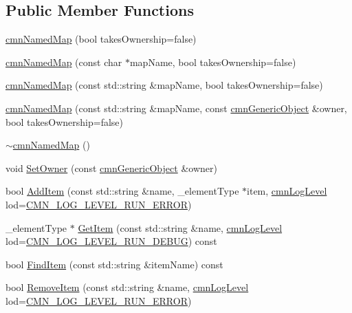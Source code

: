\subsection*{Public Member Functions}
\begin{DoxyCompactItemize}
\item 
\hyperlink{classcmn_named_map_a4c250a20fc4693af98372a5bddf23fc3}{cmn\+Named\+Map} (bool takes\+Ownership=false)
\item 
\hyperlink{classcmn_named_map_a9204d10744786fb89a8a4c257657f7af}{cmn\+Named\+Map} (const char $\ast$map\+Name, bool takes\+Ownership=false)
\item 
\hyperlink{classcmn_named_map_aba94948e0a87cb078537dd42e3ea9da7}{cmn\+Named\+Map} (const std\+::string \&map\+Name, bool takes\+Ownership=false)
\item 
\hyperlink{classcmn_named_map_a1eb8737aa452d92dee390a1e13ed3534}{cmn\+Named\+Map} (const std\+::string \&map\+Name, const \hyperlink{classcmn_generic_object}{cmn\+Generic\+Object} \&owner, bool takes\+Ownership=false)
\item 
\hyperlink{classcmn_named_map_a79c1232b9dd2f9577cde17a81179ab00}{$\sim$cmn\+Named\+Map} ()
\item 
void \hyperlink{classcmn_named_map_add0f54de1d0383787c7ce070d24dac64}{Set\+Owner} (const \hyperlink{classcmn_generic_object}{cmn\+Generic\+Object} \&owner)
\item 
bool \hyperlink{classcmn_named_map_a0df1ea146e99d1ac628c7b51717b40df}{Add\+Item} (const std\+::string \&name, \+\_\+element\+Type $\ast$item, \hyperlink{cmn_log_lo_d_8h_a70c67165c37a0971e0dd1a85d4edaaae}{cmn\+Log\+Level} lod=\hyperlink{cmn_log_lo_d_8h_a7ace6c3eaafa3c4670c6d0dc71406e37}{C\+M\+N\+\_\+\+L\+O\+G\+\_\+\+L\+E\+V\+E\+L\+\_\+\+R\+U\+N\+\_\+\+E\+R\+R\+O\+R})
\item 
\+\_\+element\+Type $\ast$ \hyperlink{classcmn_named_map_aaebc16da1a7a806b349e7e5f7e41da09}{Get\+Item} (const std\+::string \&name, \hyperlink{cmn_log_lo_d_8h_a70c67165c37a0971e0dd1a85d4edaaae}{cmn\+Log\+Level} lod=\hyperlink{cmn_log_lo_d_8h_a285ec3fc9bf3bf806e6752070005504b}{C\+M\+N\+\_\+\+L\+O\+G\+\_\+\+L\+E\+V\+E\+L\+\_\+\+R\+U\+N\+\_\+\+D\+E\+B\+U\+G}) const 
\item 
bool \hyperlink{classcmn_named_map_ae33739318733f66074f308e6077b0cbb}{Find\+Item} (const std\+::string \&item\+Name) const 
\item 
bool \hyperlink{classcmn_named_map_a1f41463cb8ad29cc123b6eb751876239}{Remove\+Item} (const std\+::string \&name, \hyperlink{cmn_log_lo_d_8h_a70c67165c37a0971e0dd1a85d4edaaae}{cmn\+Log\+Level} lod=\hyperlink{cmn_log_lo_d_8h_a7ace6c3eaafa3c4670c6d0dc71406e37}{C\+M\+N\+\_\+\+L\+O\+G\+\_\+\+L\+E\+V\+E\+L\+\_\+\+R\+U\+N\+\_\+\+E\+R\+R\+O\+R})

\end{DoxyCompactItemize}
